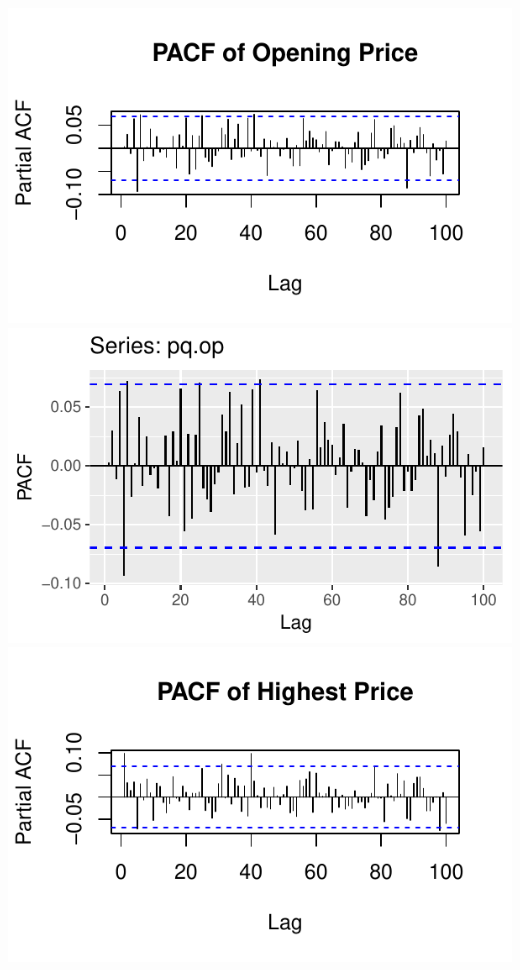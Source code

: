 \documentclass[]{tufte-book}
\begin{document}
\includegraphics{binary-forex-trading-Q1_files/figure-latex/acf-pacf-1}
\includegraphics{binary-forex-trading-Q1_files/figure-latex/acf-pacf-2}
\includegraphics{binary-forex-trading-Q1_files/figure-latex/acf-pacf-3}
\end{document}
